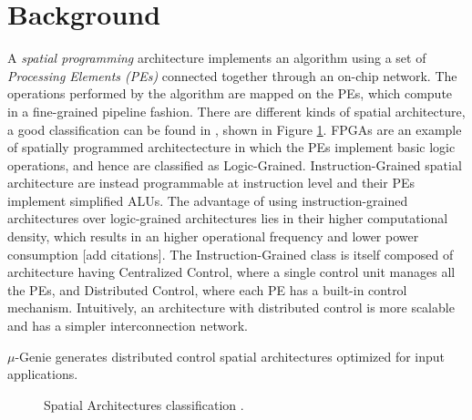 \section{Background}
A \textit{spatial programming} architecture implements an algorithm using a set of \textit{Processing Elements (PEs)} connected together through an on-chip network. The operations performed by the algorithm are mapped on the PEs, which compute in a fine-grained pipeline fashion. There are different kinds of spatial architecture, a good classification can be found in \cite{parashar2014efficient}, shown in Figure \ref{fig:spatial_class}. FPGAs are an example of spatially programmed architectecture in which the PEs implement basic logic operations, and hence are classified as Logic-Grained. Instruction-Grained spatial architecture are instead programmable at instruction level and their PEs implement simplified ALUs. The advantage of using instruction-grained architectures over logic-grained architectures lies in their higher computational density, which results in an higher operational frequency and lower power consumption [add citations]. The Instruction-Grained class is itself composed of architecture having Centralized Control, where a single control unit manages all the PEs, and Distributed Control, where each PE has a built-in control mechanism. Intuitively, an architecture with distributed control is more scalable and has a simpler interconnection network.

$\mu$-Genie generates distributed control spatial architectures optimized for input applications.
\begin{figure}
  \centering
  \caption{Spatial Architectures classification \cite{parashar2014efficient}.} \label{fig:spatial_class}
\end{figure}

